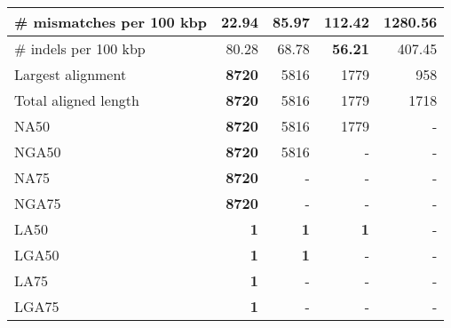 \documentclass[12pt,a4paper]{article}
\begin{document}
\begin{table}[ht]
\begin{center}
\begin{tabular}{|l*{4}{|r}|}
\# mismatches per 100 kbp & {\bf 22.94} & 85.97 & 112.42 & 1280.56 \\ \hline
\# indels per 100 kbp & 80.28 & 68.78 & {\bf 56.21} & 407.45 \\ \hline
Largest alignment & {\bf 8720} & 5816 & 1779 & 958 \\ \hline
Total aligned length & {\bf 8720} & 5816 & 1779 & 1718 \\ \hline
NA50 & {\bf 8720} & 5816 & 1779 & - \\ \hline
NGA50 & {\bf 8720} & 5816 & - & - \\ \hline
NA75 & {\bf 8720} & - & - & - \\ \hline
NGA75 & {\bf 8720} & - & - & - \\ \hline
LA50 & {\bf 1} & {\bf 1} & {\bf 1} & - \\ \hline
LGA50 & {\bf 1} & {\bf 1} & - & - \\ \hline
LA75 & {\bf 1} & - & - & - \\ \hline
LGA75 & {\bf 1} & - & - & - \\ \hline
\end{tabular}
\end{center}
\end{table}
\end{document}
